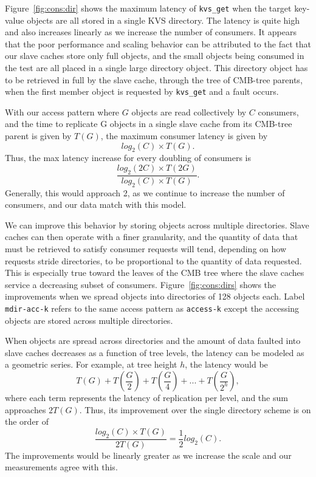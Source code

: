 Figure~\ref{fig:cons:dir} shows the maximum latency of {\tt kvs\_get}
when the target key-value objects are all stored in a single
KVS directory. The latency is quite high and also increases
linearly as we increase the number of consumers. 
It appears that the poor performance and scaling behavior 
can be attributed to the fact that our slave caches store only full
objects, and the small objects being consumed in the test are all
placed in a single large directory object.
This directory object has to be retrieved in full by the slave cache,
through the tree of CMB-tree parents, when the first
member object is requested by {\tt kvs\_get} and a fault occurs.

With our access pattern where $G$ objects are read collectively by
$C$ consumers, and the time to replicate G objects in a single slave cache
from its CMB-tree parent is given by $T(G)$, the maximum consumer latency is given by
\begin{equation}
log_2(C) \times T(G).
\end{equation}
Thus, the max latency increase for every doubling of consumers is
\begin{equation}
\frac{log_2(2C) \times T(2G)}{log_2(C) \times T(G)}.
\end{equation}
Generally, this would approach 2, 
as we continue to increase the number of consumers,
and our data match with this model.

We can improve this behavior by storing objects across multiple
directories. Slave caches can then operate with a finer granularity,
and the quantity of data that must be retrieved to satisfy consumer
requests will tend, depending on how requests stride directories,
to be proportional to the quantity of data requested.
This is especially true toward the leaves of the CMB tree where the
slave caches service a decreasing subset of consumers.
Figure~\ref{fig:cons:dirs} shows the improvements 
when we spread objects into directories of 128 objects each.
Label {\tt mdir-acc-k} refers to the same access pattern as {\tt access-k} 
except the accessing objects are stored across multiple directories.

\ifcomments
{}
\fi
When objects are spread across directories and the amount of data
faulted into slave caches decreases as a function of tree levels, 
the latency can be modeled as a geometric series.
For example, at tree height $h$, the latency would be 
\begin{equation}
T(G) + T(\frac{G}{2}) + T(\frac{G}{4}) + ... + T(\frac{G}{2^h}),
\end{equation}
where each term represents the latency of replication per level,
and the sum approaches $2T(G)$. Thus, its improvement over the single
directory scheme is on the order of 
\begin{equation}
\frac{log_2(C) \times T(G)}{2 T(G)} = \frac{1}{2}log_2(C).
\end{equation}
The improvements would be linearly 
greater as we increase the scale and our measurements agree with this. 

